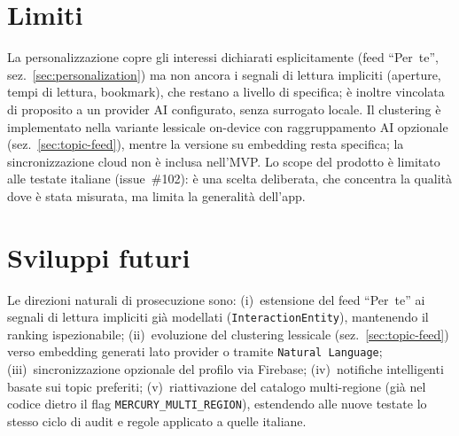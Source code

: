 \section{Limiti}
La personalizzazione copre gli interessi dichiarati esplicitamente
(feed ``Per~te'', sez.~\ref{sec:personalization}) ma non ancora i
segnali di lettura impliciti (aperture, tempi di lettura, bookmark),
che restano a livello di specifica; è inoltre vincolata di proposito a
un provider AI configurato, senza surrogato locale. Il clustering è
implementato nella variante lessicale on-device con raggruppamento AI
opzionale (sez.~\ref{sec:topic-feed}), mentre la versione su embedding
resta specifica; la sincronizzazione cloud non è inclusa nell'MVP. Lo scope del
prodotto è limitato alle testate italiane (issue~\#102): è una scelta
deliberata, che concentra la qualità dove è stata misurata, ma limita la
generalità dell'app.

\section{Sviluppi futuri}
Le direzioni naturali di prosecuzione sono: (i)~estensione del feed
``Per~te'' ai segnali di lettura impliciti già modellati
(\texttt{InteractionEntity}), mantenendo il ranking ispezionabile;
(ii)~evoluzione del clustering lessicale
(sez.~\ref{sec:topic-feed}) verso embedding generati lato provider o
tramite \texttt{Natural~Language};
(iii)~sincronizzazione opzionale del profilo via Firebase; (iv)~notifiche
intelligenti basate sui topic preferiti; (v)~riattivazione del catalogo
multi-regione (già nel codice dietro il flag \texttt{MERCURY\_MULTI\_REGION}),
estendendo alle nuove testate lo stesso ciclo di audit e regole applicato a
quelle italiane.
